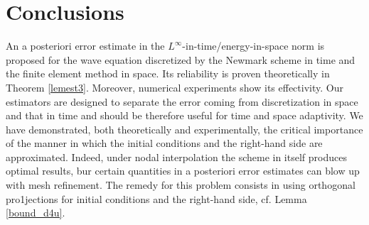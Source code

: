 \documentclass{imanum}
\begin{document}
\section{Conclusions}
An a posteriori error estimate in the $L^{\infty}$-in-time/energy-in-space norm is proposed for the wave equation discretized by the Newmark scheme in time and the finite element method in space.  Its reliability is proven theoretically in Theorem \ref{lemest3}. Moreover, numerical experiments show its effectivity. Our estimators are designed  to separate the error coming from discretization in space and that in time and should be therefore useful for time and space adaptivity. We have demonstrated, both theoretically and experimentally, the critical importance of the manner in which the initial conditions and the right-hand side are approximated. Indeed, under nodal interpolation the scheme in itself produces optimal results, bur certain quantities in a posteriori error estimates can blow up with mesh refinement. The remedy for this problem consists in using   orthogonal pro1jections for initial conditions and the right-hand side, cf. Lemma \ref{bound_d4u}. 

\pagebreak



\end{document}
